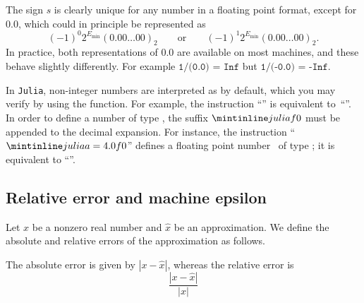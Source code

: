 
\begin{remark}
    The sign $s$ is clearly unique for any number in a floating point format,
    except for $0.0$,
    which could in principle be represented as
    \[
        (-1)^0 2^{E_{\min}} (0.00\dots00)_2
        \qquad \text{or} \qquad
        (-1)^1 2^{E_{\min}} (0.00\dots00)_2.
    \]
    In practice, both representations of 0.0 are available on most machines,
    and these behave slightly differently.
    For example $\texttt{1/(0.0) = Inf}$ but $\texttt{1/(-0.0) = -Inf}$.
\end{remark}

In \texttt{Julia}, non-integer numbers are interpreted as  by default,
which you may verify by using the  function.
For example, the instruction ``'' is equivalent to~``''.
In order to define a number of type ,
the suffix $\julia{f0}$ must be appended to the decimal expansion.
For instance, the instruction ``$\julia{a = 4.0f0}$'' defines a floating point number~ of type ;
it is equivalent to ``''.

\subsection{Relative error and machine epsilon}%
\label{sub:relative_error_and_epsilon_machine}
Let $x$ be a nonzero real number and $\widehat x$ be an approximation.
We define the absolute and relative errors of the approximation as follows.
\begin{definition}
    The absolute error is given by $|x - \widehat x|$,
    whereas the relative error is
    \[
        \frac{|x - \widehat x|}{|x|}
    \]
\end{definition}

